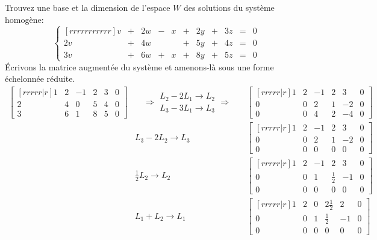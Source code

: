 \begin{exemple}
Trouvez une base et la dimension de l'espace $W$ des solutions du système homogène:
\[
\left\{
\begin{matrix}[rrrrrrrrrrr]
v &+& 2w &-& x &+& 2y &+& 3z &=& 0\\
2v &+& 4w &&  &+& 5y &+&  4z &=& 0\\
3v &+& 6w &+& x &+& 8y &+&  5z &=& 0
\end{matrix}
\right.
\]
\solution
Écrivons la matrice augmentée du système et amenons-là sous une forme
échelonnée réduite.
\[
\begin{matrix}
\begin{bmatrix}[rrrrr|r]
1 & 2 & -1 & 2 & 3 & 0 \\
2 & 4 & 0 & 5 & 4 & 0 \\
3 & 6 & 1 & 8 & 5 & 0
\end{bmatrix}
&\quad \Rightarrow
\begin{matrix}
L_2 - 2L_1 \rightarrow L_2 \\
L_3 - 3L_1 \rightarrow L_3
\end{matrix}
\Rightarrow
\quad&
\begin{bmatrix}[rrrrr|r]
1 & 2 & -1 & 2 & 3 & 0 \\
0 & 0 &  2 & 1 & -2 & 0 \\
0 & 0 &  4 & 2 & -4 & 0
\end{bmatrix}\\[15pt]
& L_3 - 2L_2 \rightarrow L_3 &
\begin{bmatrix}[rrrrr|r]
1 & 2 & -1 & 2 & 3 & 0 \\
0 & 0 &  2 & 1 & -2 & 0 \\
0 & 0 &  0 & 0 & 0 & 0
\end{bmatrix}\\[15pt]
& \frac12 L_2 \rightarrow L_2 &
\begin{bmatrix}[rrrrr|r]
1 & 2 & -1 & 2 & 3 & 0 \\
0 & 0 &  1 & \frac12 & -1 & 0 \\
0 & 0 &  0 & 0 & 0 & 0
\end{bmatrix}\\[15pt]
& L_1 + L_2 \rightarrow L_1 &
\begin{bmatrix}[rrrrr|r]
1 & 2 & 0 & 2\frac12 & 2 & 0 \\
0 & 0 &  1 & \frac12 & -1 & 0 \\
0 & 0 &  0 & 0 & 0 & 0
\end{bmatrix}\\[15pt]
\end{matrix}
\]
\end{exemple}
